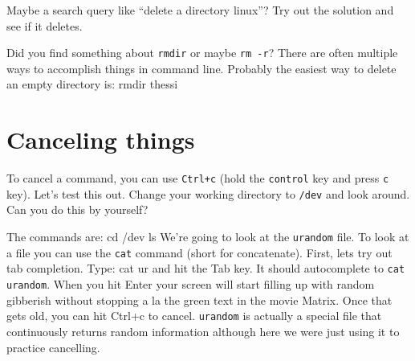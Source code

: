 \documentclass[12pt]{article}
\newenvironment{cmd}{\verbatim}{\endverbatim\vspace{3pt}}
\begin{document}
Maybe a search query like ``delete a directory linux''? Try out the solution and see if it deletes.

\vspace{.4in}

Did you find something about \texttt{rmdir} or maybe \texttt{rm -r}? There are often multiple ways to accomplish things in command line. Probably the easiest way to delete an empty directory is:
\begin{cmd}
  rmdir thessi
\end{cmd}







\section{Canceling things}
To cancel a command, you can use \texttt{Ctrl+c} (hold the \texttt{control} key and press \texttt{c} key). Let's test this out. Change your working directory to \texttt{/dev} and look around. Can you do this by yourself?

\vspace{.4in}
The commands are:
\begin{cmd}
  cd /dev
  ls
\end{cmd}
We're going to look at the \texttt{urandom} file. To look at a file you can use the \texttt{cat} command (short for concatenate). First, lets try out tab completion. Type:
\begin{cmd}
  cat ur
\end{cmd}
and hit the Tab key. It should autocomplete to \texttt{cat urandom}. When you hit Enter your screen will start filling up with random gibberish without stopping a la the green text in the movie Matrix. Once that gets old, you can hit Ctrl+c to cancel. \texttt{urandom} is actually a special file that continuously returns random information although here we were just using it to practice cancelling.
\end{document}
